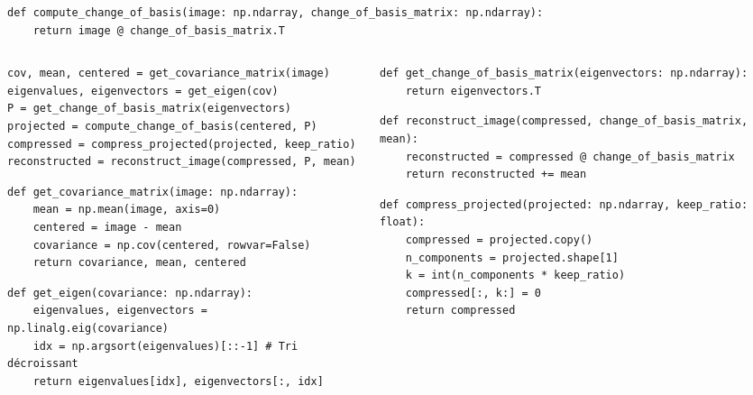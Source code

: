 \begin{frame}[fragile]
\begin{verbatim}
def compute_change_of_basis(image: np.ndarray, change_of_basis_matrix: np.ndarray):
    return image @ change_of_basis_matrix.T
\end{verbatim}

\begin{columns}[t]
\begin{column}{0.5\linewidth}
\begin{verbatim}
cov, mean, centered = get_covariance_matrix(image)
eigenvalues, eigenvectors = get_eigen(cov)
P = get_change_of_basis_matrix(eigenvectors)
projected = compute_change_of_basis(centered, P)
compressed = compress_projected(projected, keep_ratio)
reconstructed = reconstruct_image(compressed, P, mean)
\end{verbatim}

\begin{verbatim}
def get_covariance_matrix(image: np.ndarray):
    mean = np.mean(image, axis=0)
    centered = image - mean
    covariance = np.cov(centered, rowvar=False)
    return covariance, mean, centered
\end{verbatim}

\begin{verbatim}
def get_eigen(covariance: np.ndarray):
    eigenvalues, eigenvectors = np.linalg.eig(covariance)
    idx = np.argsort(eigenvalues)[::-1] # Tri décroissant
    return eigenvalues[idx], eigenvectors[:, idx]
\end{verbatim}
\end{column}
\begin{column}{0.5\linewidth}
\begin{verbatim}
def get_change_of_basis_matrix(eigenvectors: np.ndarray):
    return eigenvectors.T
\end{verbatim}

\begin{verbatim}
def reconstruct_image(compressed, change_of_basis_matrix, mean):
    reconstructed = compressed @ change_of_basis_matrix
    return reconstructed += mean
\end{verbatim}

\begin{verbatim}
def compress_projected(projected: np.ndarray, keep_ratio: float):
    compressed = projected.copy()
    n_components = projected.shape[1]
    k = int(n_components * keep_ratio)
    compressed[:, k:] = 0
    return compressed
\end{verbatim}
\end{column}
\end{columns}
\end{frame}
